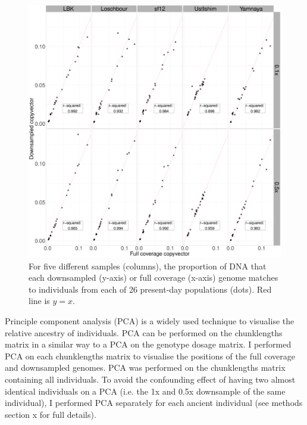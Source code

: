 \begin{figure}[htp]
    \centering
    \includegraphics[width=1.0\textwidth]{../images/chapter1/CP_correlation_allSamples_0.1x_0.5x_30x_moderns.pdf}
    \caption{For five different samples (columns), the proportion of DNA that each downsampled (y-axis) or full coverage (x-axis) genome matches to individuals from each of 26 present-day populations (dots). Red line is $y=x$.}
    \label{fig:CP_correlation_allSamples_0.1x_0.5x_30x_moderns}
\end{figure}

Principle component analysis (PCA) is a widely used technique to visualise the relative ancestry of individuals. PCA can be performed on the chunklengths matrix in a similar way to a PCA on the genotype dosage matrix. I performed PCA on each chunklengths matrix to visualise the positions of the full coverage and downsampled genomes. PCA was performed on the chunklengths matrix containing all individuals. To avoid the confounding effect of having two almost identical individuals on a PCA (i.e. the 1x and 0.5x downsample of the same individual), I performed PCA separately for each ancient individual (see methods section x for full details). 

